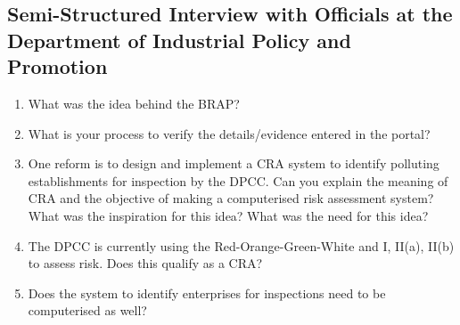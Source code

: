 \documentclass[a4paper, 12pt]{article}
\begin{document}
		\subsection*{Semi-Structured Interview with Officials at the Department of Industrial Policy and Promotion}
                    \begin{mdframed}[backgroundcolor=gray!20]
		\begin{enumerate}
			\item{What was the idea behind the BRAP?}
			\item{What is your process to verify the details/evidence entered in the portal?}
			\item{One reform is to design and implement a CRA system to identify polluting establishments for inspection by the DPCC. Can you explain the meaning of CRA and the objective of making a computerised risk assessment system? What was the inspiration for this idea? What was the need for this idea?}
			\item{The DPCC is currently using the Red-Orange-Green-White and I, II(a), II(b) to assess risk. Does this qualify as a CRA?}
			\item{Does the system to identify enterprises for inspections need to be computerised as well?}
		\end{enumerate}
		\end{mdframed}
	
		
\end{document}
